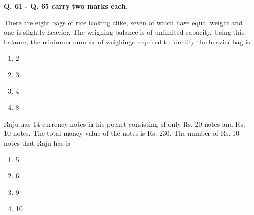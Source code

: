 	\item[]{
		\textbf{Q. 61 - Q. 65 carry two marks each.}
	}
    \item{
            There are eight bags of rice looking alike, seven of which have equal weight and one is slightly
            heavier. The weighing balance is of unlimited capacity. Using this balance, the minimum number
            of weighings required to identify the heavier bag is
             \hfill
                
            \begin{multicols}{4}
                \begin{enumerate}
                	\item 2
                	\item 3
                	\item 4
                	\item 8
                \end{enumerate}
            \end{multicols}

        
        }
    \item{
            Raju has 14 currency notes in his pocket consisting of only Rs. 20 notes and Rs. 10 notes. The total
            money value of the notes is Rs. 230. The number of Rs. 10 notes that Raju has is
                
            \begin{multicols}{4}
                \begin{enumerate}
                	\item 5
                	\item 6
                	\item 9
                	\item 10
                \end{enumerate}
            \end{multicols}
        
        }
